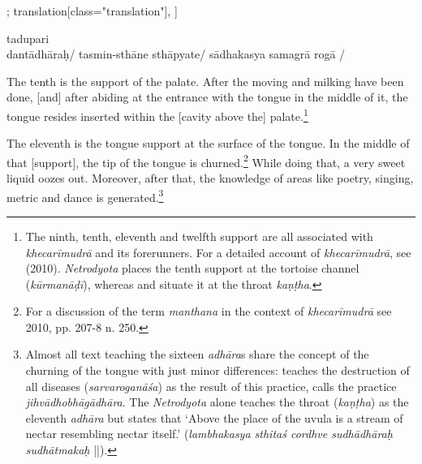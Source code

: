 \begin{alignment}[
  texts=edition[class="edition"];
  translation[class="translation"],
  ]
\begin{edition}
\begin{prose}[p30_04]
tadupari
\\
dantādhāraḥ/
tasmin-sthāne
sthāpyate/
sādhakasya samagrā rogā
/
    \end{prose}
  \end{edition}
  \begin{translation}
    \begin{tlate}[p30_04]
      \noindent
      The tenth is the support of the palate. After the moving and milking have been done, [and] after abiding at the entrance with the tongue in the middle of it, the tongue resides inserted within the [cavity above the] palate.\footnote{The ninth, tenth, eleventh and twelfth support are all associated with \textit{khecarīmudrā} and its forerunners. For a detailed account of \textit{khecarīmudrā}, see \citeauthor{mallinson2010} (2010). \textit{Netrodyota} places the tenth support at the tortoise channel (\textit{kūrmanāḍī}), whereas  and  situate it at the throat \textit{kaṇṭha}.}
      
      The eleventh is the tongue support at the surface of the tongue. In the middle of that [support], the tip of the tongue is churned.\footnote{For a discussion of the term \textit{manthana} in the context of \textit{khecarīmudrā} see \citeauthor{mallinson2010} 2010, pp. 207-8 n. 250.} While doing that, a very sweet liquid oozes out. Moreover, after that, the knowledge of areas like poetry, singing, metric and dance is generated.\footnote{Almost all text teaching the sixteen \textit{adhāra}s share the concept of the churning of the tongue with just minor differences:  teaches the destruction of all diseases (\textit{sarvaroganāśa}) as the result of this practice,  calls the practice \textit{jihvādhobhāgādhāra}. The \textit{Netrodyota} alone teaches the throat (\textit{kaṇṭha}) as the eleventh \textit{adhāra} but states that `Above the place of the uvula is a stream of nectar resembling nectar itself.' (\textit{lambhakasya sthitaś cordhve sudhādhāraḥ sudhātmakaḥ} ||).}
    

\end{tlate}
\end{translation}
\end{alignment}
